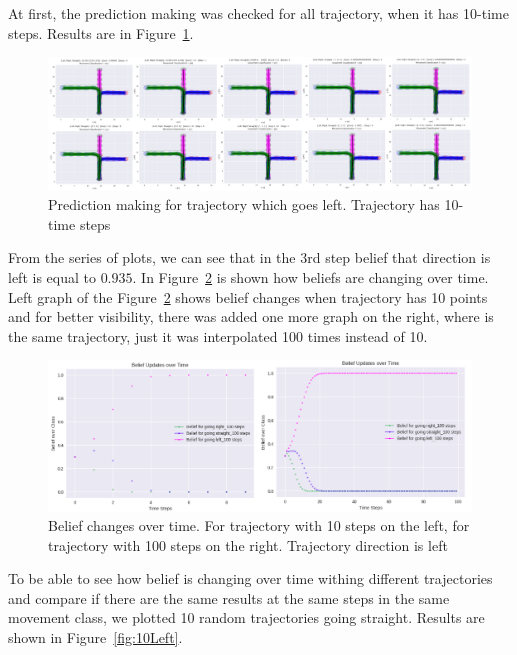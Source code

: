 At first, the prediction making was checked for all trajectory, when it has 10-time steps. Results are in Figure~\ref{fig:leftPrediction}. 

\begin{figure}[h]
	\centering  	
	\includegraphics[width=18cm]{img/0_prediction_left.PNG}
	\caption{Prediction making for trajectory which goes left. Trajectory has 10-time steps}
	\label{fig:leftPrediction}    
\end{figure}

From the series of plots, we can see that in the 3rd step belief that direction is left is equal to $0.935$. In Figure~\ref{fig:CompareLeft} is shown how beliefs are changing over time. Left graph of the Figure~\ref{fig:CompareLeft} shows belief changes when trajectory has 10 points and for better visibility, there was added one more graph on the right, where is the same trajectory, just it was interpolated 100 times instead of 10.

\begin{figure}[h]
	\centering  	
	\includegraphics[width=15cm]{img/10_100_compared_left.jpg}
	\caption{Belief changes over time. For trajectory with 10 steps on the left, for trajectory with 100 steps on the right. Trajectory direction is left}
	\label{fig:CompareLeft}    
\end{figure}

To be able to see how belief is changing over time withing different trajectories and compare if there are the same results at the same steps in the same movement class, we plotted 10 random trajectories going straight. Results are shown in Figure~\ref{fig:10Left}.

